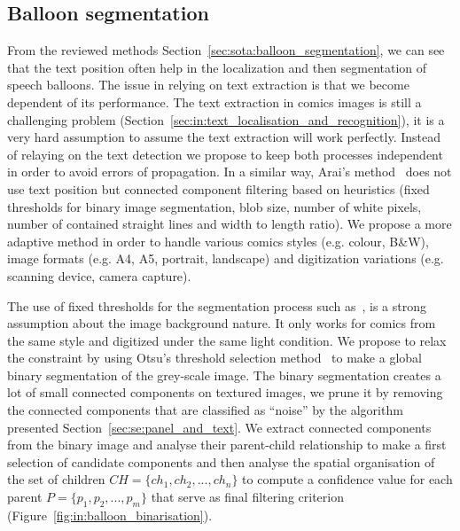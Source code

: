 \subsection{Balloon segmentation} %
\label{sub:in:balloon_segmentation}
From the reviewed methods Section~\ref{sec:sota:balloon_segmentation}, we can see that the text position often help in the localization and then segmentation of speech balloons.
The issue in relying on text extraction is that we become dependent of its performance.
The text extraction in comics images is still a challenging problem (Section~\ref{sec:in:text_localisation_and_recognition}), it is a very hard assumption to assume the text extraction will work perfectly. 
Instead of relaying on the text detection we propose to keep both processes independent in order to avoid errors of propagation.
In a similar way, Arai's method~\cite{Arai11} does not use text position but connected component filtering based on heuristics (fixed thresholds for binary image segmentation, blob size, number of white pixels, number of contained straight lines and width to length ratio). 
We propose a more adaptive method in order to handle various comics styles (e.g. colour, B\&W), image formats (e.g. A4, A5, portrait, landscape) and digitization variations (e.g. scanning device, camera capture).

The use of fixed thresholds for the segmentation process such as~\cite{Arai11}, is a strong assumption about the image background nature.
It only works for comics from the same style and digitized under the same light condition.
We propose to relax the constraint by using Otsu's threshold selection method~\cite{otsu79} to make a global binary segmentation of the grey-scale image.
The binary segmentation creates a lot of small connected components on textured images, we prune it by removing the connected components that are classified as ``noise'' by the algorithm presented Section~\ref{sec:se:panel_and_text}.
We extract connected components from the binary image and analyse their parent-child relationship to make a first selection of candidate components and then analyse the spatial organisation of the set of children $CH=\{ch_1, ch_2,...,ch_n\}$ to compute a confidence value for each parent $P=\{p_1, p_2,...,p_m\}$ that serve as final filtering criterion (Figure~\ref{fig:in:balloon_binarisation}).


